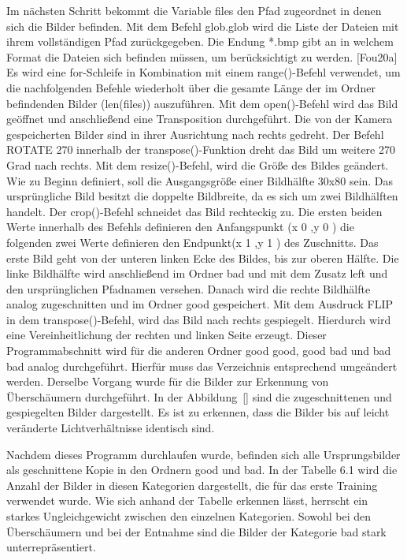 Im nächsten Schritt bekommt die Variable files den Pfad zugeordnet in denen sich
die Bilder befinden. Mit dem Befehl glob.glob wird die Liste der Dateien mit ihrem
vollständigen Pfad zurückgegeben. Die Endung *.bmp gibt an in welchem Format die
Dateien sich befinden müssen, um berücksichtigt zu werden. [Fou20a] Es wird eine 
for-Schleife in Kombination mit einem range()-Befehl verwendet, um die nachfolgenden 
Befehle wiederholt über die gesamte Länge der im Ordner befindenden Bilder (len(files))
auszuführen. Mit dem open()-Befehl wird das Bild geöffnet und anschließend eine 
Transposition durchgeführt. Die von der Kamera gespeicherten Bilder sind in ihrer Ausrichtung
nach rechts gedreht. Der Befehl ROTATE 270 innerhalb der transpose()-Funktion dreht
das Bild um weitere 270 Grad nach rechts. Mit dem resize()-Befehl, wird die Größe des
Bildes geändert. Wie zu Beginn definiert, soll die Ausgangsgröße einer Bildhälfte 30x80
sein. Das ursprüngliche Bild besitzt die doppelte Bildbreite, da es sich um zwei Bildhälften
handelt. Der crop()-Befehl schneidet das Bild rechteckig zu. Die ersten beiden Werte innerhalb 
des Befehls definieren den Anfangspunkt (x 0 ,y 0 ) die folgenden zwei Werte definieren
den Endpunkt(x 1 ,y 1 ) des Zuschnitts. Das erste Bild geht von der unteren linken Ecke des
Bildes, bis zur oberen Hälfte. Die linke Bildhälfte wird anschließend im Ordner bad und
mit dem Zusatz left und den ursprünglichen Pfadnamen versehen. Danach wird die rechte 
Bildhälfte analog zugeschnitten und im Ordner good gespeichert. Mit dem Ausdruck
FLIP in dem transpose()-Befehl, wird das Bild nach rechts gespiegelt. Hierdurch wird eine
Vereinheitlichung der rechten und linken Seite erzeugt. Dieser Programmabschnitt wird
für die anderen Ordner good good, good bad und bad bad analog durchgeführt. Hierfür
muss das Verzeichnis entsprechend umgeändert werden. Derselbe Vorgang wurde für die
Bilder zur Erkennung von Überschäumern durchgeführt. In der Abbildung~\ref{} sind die
zugeschnittenen und gespiegelten Bilder dargestellt. Es ist zu erkennen, dass die Bilder
bis auf leicht veränderte Lichtverhältnisse identisch sind.

Nachdem dieses Programm durchlaufen wurde, befinden sich alle Ursprungsbilder als 
geschnittene Kopie in den Ordnern good und bad. In der Tabelle 6.1 wird die Anzahl der
Bilder in diesen Kategorien dargestellt, die für das erste Training verwendet wurde. Wie
sich anhand der Tabelle erkennen lässt, herrscht ein starkes Ungleichgewicht zwischen
den einzelnen Kategorien. Sowohl bei den Überschäumern und bei der Entnahme sind die
Bilder der Kategorie bad stark unterrepräsentiert.

